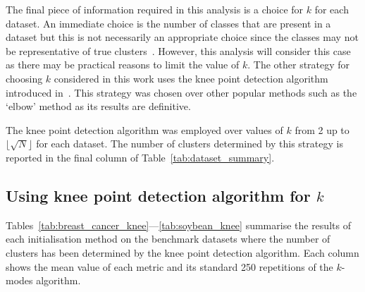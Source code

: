 \documentclass[11pt]{article}
\begin{document}
The final piece of information required in this analysis is a choice for \(k\)
for each dataset. An immediate choice is the number of classes that are present
in a dataset but this is not necessarily an appropriate choice since the classes
may not be representative of true clusters~\cite{Memoli2011}. However, this
analysis will consider this case as there may be practical reasons to limit the
value of \(k\). The other strategy for choosing \(k\) considered in this work
uses the knee point detection algorithm introduced in~\cite{Satopaa2011}. This
strategy was chosen over other popular methods such as the `elbow' method as its
results are definitive.

The knee point detection algorithm was employed over values of \(k\) from 2 up
to \(\lfloor\sqrt N\rfloor\) for each dataset. The number of clusters determined
by this strategy is reported in the final column of
Table~\ref{tab:dataset_summary}.


\subsection{Using knee point detection algorithm for \(k\)}\label{subsec:knee}

Tables~\ref{tab:breast_cancer_knee}---\ref{tab:soybean_knee}
summarise the results of each initialisation method on the benchmark datasets
where the number of clusters has been determined by the knee point detection
algorithm. Each column shows the mean value of each metric and its standard
250
repetitions of the \(k\)-modes algorithm.
\end{document}
